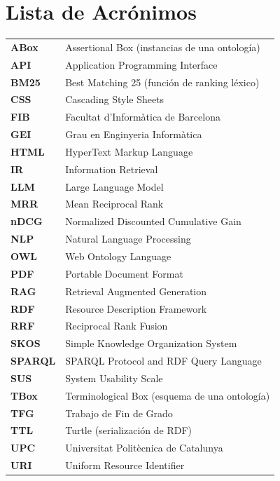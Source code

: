 \documentclass[12pt, a4paper, twoside]{report}
\begin{document}
\tableofcontents
\listoffigures
\listoftables

\chapter*{Lista de Acr\'onimos}

\begin{tabular}{ll}
\textbf{ABox} & Assertional Box (instancias de una ontolog\'ia) \\
\textbf{API} & Application Programming Interface \\
\textbf{BM25} & Best Matching 25 (funci\'on de ranking l\'exico) \\
\textbf{CSS} & Cascading Style Sheets \\
\textbf{FIB} & Facultat d'Inform\`atica de Barcelona \\
\textbf{GEI} & Grau en Enginyeria Inform\`atica \\
\textbf{HTML} & HyperText Markup Language \\
\textbf{IR} & Information Retrieval \\
\textbf{LLM} & Large Language Model \\
\textbf{MRR} & Mean Reciprocal Rank \\
\textbf{nDCG} & Normalized Discounted Cumulative Gain \\
\textbf{NLP} & Natural Language Processing \\
\textbf{OWL} & Web Ontology Language \\
\textbf{PDF} & Portable Document Format \\
\textbf{RAG} & Retrieval Augmented Generation \\
\textbf{RDF} & Resource Description Framework \\
\textbf{RRF} & Reciprocal Rank Fusion \\
\textbf{SKOS} & Simple Knowledge Organization System \\
\textbf{SPARQL} & SPARQL Protocol and RDF Query Language \\
\textbf{SUS} & System Usability Scale \\
\textbf{TBox} & Terminological Box (esquema de una ontolog\'ia) \\
\textbf{TFG} & Trabajo de Fin de Grado \\
\textbf{TTL} & Turtle (serializaci\'on de RDF) \\
\textbf{UPC} & Universitat Polit\`ecnica de Catalunya \\
\textbf{URI} & Uniform Resource Identifier \\
\end{tabular}
\end{document}
